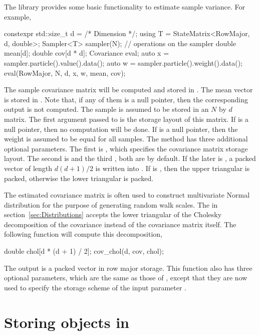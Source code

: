 The library provides some basic functionality to estimate sample variance. For
example,
\begin{cppcode}
  constexpr std::size_t d = /* Dimension */;
  using T = StateMatrix<RowMajor, d, double>;
  Sampler<T> sampler(N);
  // operations on the sampler
  double mean[d];
  double cov[d * d];
  Covariance eval;
  auto x = sampler.particle().value().data();
  auto w = sampler.particle().weight().data();
  eval(RowMajor, N, d, x, w, mean, cov);
\end{cppcode}
The sample covariance matrix will be computed and stored in .
The mean vector is stored in . Note that, if any of them is a
null pointer, then the corresponding output is not computed. The sample
 is assumed to be stored in an $N$ by $d$ matrix. The first
argument passed to  is the storage layout of this matrix. If
 is a null pointer, then no computation will be done. If
 is a null pointer, then the weight is assumed to be equal for all
samples. The method has three additional optional parameters. The first is
, which specifies the covariance matrix storage layout.
The second is  and the third , both
are  by default. If the later is , a
packed vector of length $d(d+1)/2$ is written into . If
 is , then the upper triangular is
packed, otherwise the lower triangular is packed. 

The estimated covariance matrix is often used to construct multivariate Normal
distribution for the purpose of generating random walk scales. The
 in section~\ref{sec:Distributions} accepts
the lower triangular of the Cholesky decomposition of the covariance instead of
the covariance matrix itself. The following function will compute this
decomposition,
\begin{cppcode}
  double chol[d * (d + 1) / 2];
  cov_chol(d, cov, chol);
\end{cppcode}
The output  is a packed vector in row major storage. This
function also has three optional parameters, which are the same as those of
, except that they are now used to specify
the storage scheme of the input parameter . 

\section{Storing objects in \protect\hdf}
\label{sec:Storing objects in HDF5}

